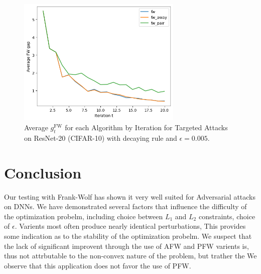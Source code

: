 \documentclass{article}
\begin{document}
\begin{figure}[H]
    \centering
    \includegraphics[width=0.7\textwidth]{plots/mdl_compare_avg_FWgap_by_iter.png}
    \caption{Average $g^\text{FW}_t$ for each Algorithm by Iteration for Targeted Attacks on ResNet-20 (CIFAR-10) with decaying rule and $\epsilon = 0.005$.}
    \label{fig:converge-compare}
\end{figure}

\section{Conclusion}
Our testing with Frank-Wolf has shown it very well suited for Adversarial attacks on DNNs. 
We have demonstrated several factors that influence the difficulty of the optimization probelm, including choice between $L_1$ and $L_2$ constraints, choice of $\epsilon$.
Varients most often produce nearly identical perturbations, This provides some indication as to the stability of the optimization probelm. We suspect that the lack of significant improvent through the use of AFW and PFW varients is, thus not attrbutable to the non-convex nature of the problem, but trather the 
We observe that this application does not favor the use of PFW. 
\end{document}
